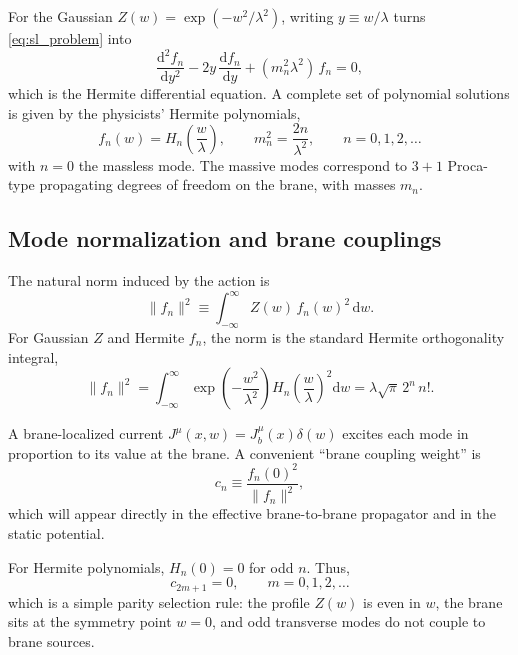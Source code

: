 \documentclass[11pt]{article}
\newcommand{\dd}{\mathrm d}
\newcommand{\J}{J}
\newcommand{\Z}{Z}
\newcommand{\lam}{\lambda}      %
\begin{document}
For the Gaussian \(\Z(w)=\exp(-w^2/\lam^2)\), writing \(y\equiv w/\lam\) turns
\cref{eq:sl_problem} into
\begin{equation}
  \frac{\dd^2 f_n}{\dd y^2} - 2y\,\frac{\dd f_n}{\dd y} + (m_n^2\lam^2)\,f_n = 0,
\end{equation}
which is the Hermite differential equation. A complete set of polynomial
solutions is given by the physicists' Hermite polynomials,
\begin{equation}
  f_n(w) = H_n\!\left(\frac{w}{\lam}\right),
  \qquad
  m_n^2 = \frac{2n}{\lam^2},
  \qquad n=0,1,2,\ldots
  \label{eq:hermite_spectrum}
\end{equation}
with \(n=0\) the massless mode. The massive modes correspond to \(3+1\) Proca-type
propagating degrees of freedom on the brane, with masses \(m_n\).

\subsection{Mode normalization and brane couplings}
\label{sec:kk_couplings}

The natural norm induced by the action is
\begin{equation}
  \|f_n\|^2 \equiv \int_{-\infty}^{\infty}\Z(w)\,f_n(w)^2\,\dd w.
\end{equation}
For Gaussian \(\Z\) and Hermite \(f_n\), the norm is the standard Hermite orthogonality
integral,
\begin{equation}
  \|f_n\|^2
  = \int_{-\infty}^{\infty}\exp\!\left(-\frac{w^2}{\lam^2}\right)
    H_n\!\left(\frac{w}{\lam}\right)^2 \dd w
  = \lam\sqrt{\pi}\,2^n\,n!.
  \label{eq:hermite_norm}
\end{equation}

A brane-localized current \(\J^\mu(x,w)=\J_b^\mu(x)\delta(w)\) excites each mode in
proportion to its value at the brane. A convenient ``brane coupling weight'' is
\begin{equation}
  c_n \equiv \frac{f_n(0)^2}{\|f_n\|^2},
  \label{eq:cn_def}
\end{equation}
which will appear directly in the effective brane-to-brane propagator and in the
static potential.

For Hermite polynomials, \(H_n(0)=0\) for odd \(n\). Thus,
\begin{equation}
  c_{2m+1}=0,
  \qquad m=0,1,2,\ldots
  \label{eq:odd_vanish}
\end{equation}
which is a simple parity selection rule: the profile \(\Z(w)\) is even in \(w\),
the brane sits at the symmetry point \(w=0\), and odd transverse modes do not
couple to brane sources.
\end{document}
